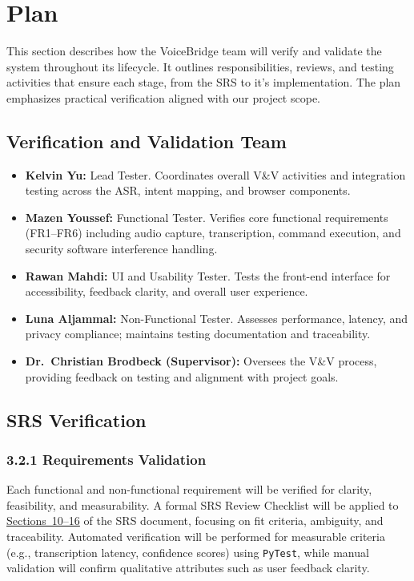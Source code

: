 \documentclass[12pt, titlepage]{article}
\begin{document}
\section{Plan}

This section describes how the VoiceBridge team will verify and validate the system throughout its lifecycle. It outlines responsibilities, reviews, and testing activities that ensure each stage, from the SRS to it’s implementation. The plan emphasizes practical verification aligned with our project scope.

\subsection{Verification and Validation Team}

\begin{itemize}
    \item \textbf{Kelvin Yu:} Lead Tester. Coordinates overall V\&V activities and integration testing across the ASR, intent mapping, and browser components.
    \item \textbf{Mazen Youssef:} Functional Tester. Verifies core functional requirements (FR1--FR6) including audio capture, transcription, command execution, and security software interference handling.
    \item \textbf{Rawan Mahdi:} UI and Usability Tester. Tests the front-end interface for accessibility, feedback clarity, and overall user experience.
    \item \textbf{Luna Aljammal:} Non-Functional Tester. Assesses performance, latency, and privacy compliance; maintains testing documentation and traceability.
    \item \textbf{Dr.~Christian Brodbeck (Supervisor):} Oversees the V\&V process, providing feedback on testing and alignment with project goals.
\end{itemize}


\subsection{SRS Verification}

\subsubsection*{3.2.1 Requirements Validation}
Each functional and non-functional requirement will be verified for clarity, feasibility, and measurability. A formal SRS Review Checklist will be applied to 
\href{https://github.com/speech-buddies/VoiceBridge/blob/main/docs/SRS-Volere/SRS.pdf}{Sections~10--16} of the SRS document, focusing on fit criteria, ambiguity, and traceability. Automated verification will be performed for measurable criteria (e.g., transcription latency, confidence scores) using \texttt{PyTest}, while manual validation will confirm qualitative attributes such as user feedback clarity.
\end{document}
